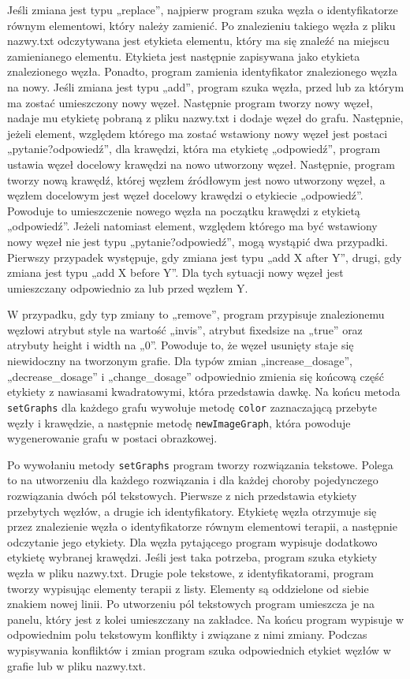 Jeśli zmiana jest typu „replace”, najpierw program szuka węzła o identyfikatorze równym elementowi, który należy zamienić. Po znalezieniu takiego węzła z pliku nazwy.txt odczytywana jest etykieta elementu, który ma się znaleźć na miejscu zamienianego elementu. Etykieta jest następnie zapisywana jako etykieta znalezionego węzła. Ponadto, program zamienia identyfikator znalezionego węzła na nowy. Jeśli zmiana jest typu „add”, program szuka węzła, przed lub za którym ma zostać umieszczony nowy węzeł. Następnie program tworzy nowy węzeł, nadaje mu etykietę pobraną z pliku nazwy.txt i dodaje węzeł do grafu. Następnie, jeżeli element, względem którego ma zostać wstawiony nowy węzeł jest postaci „pytanie?odpowiedź”, dla krawędzi, która ma etykietę „odpowiedź”, program ustawia węzeł docelowy krawędzi na nowo utworzony węzeł. Następnie, program tworzy nową krawędź, której węzłem źródłowym jest nowo utworzony węzeł, a węzłem docelowym jest węzeł docelowy krawędzi o etykiecie „odpowiedź”. Powoduje to umieszczenie nowego węzła na początku krawędzi z etykietą „odpowiedź”. Jeżeli natomiast element, względem którego ma być wstawiony nowy węzeł nie jest typu „pytanie?odpowiedź”, mogą wystąpić dwa przypadki. Pierwszy przypadek występuje, gdy zmiana jest typu „add X after Y”, drugi, gdy zmiana jest typu „add X before Y”. Dla tych sytuacji nowy węzeł jest umieszczany odpowiednio za lub przed węzłem Y. 

W przypadku, gdy typ zmiany to „remove”, program przypisuje znalezionemu węzłowi atrybut style na wartość „invis”, atrybut fixedsize na „true” oraz atrybuty height i width na „0”. Powoduje to, że węzeł usunięty staje się niewidoczny na tworzonym grafie. Dla typów zmian „increase\_dosage”, „decrease\_dosage” i „change\_dosage” odpowiednio zmienia się końcową część etykiety z nawiasami kwadratowymi, która przedstawia dawkę. Na końcu metoda \texttt{setGraphs} dla każdego grafu wywołuje metodę \texttt{color} zaznaczającą przebyte węzły i krawędzie, a następnie metodę \texttt{newImageGraph}, która powoduje wygenerowanie grafu w postaci obrazkowej. 

Po wywołaniu metody \texttt{setGraphs} program tworzy rozwiązania tekstowe. Polega to na utworzeniu dla każdego rozwiązania i dla każdej choroby pojedynczego rozwiązania dwóch pól tekstowych. Pierwsze z nich przedstawia etykiety przebytych węzłów, a drugie ich identyfikatory. Etykietę węzła otrzymuje się przez znalezienie węzła o identyfikatorze równym elementowi terapii, a następnie odczytanie jego etykiety. Dla węzła pytającego program wypisuje dodatkowo etykietę wybranej krawędzi. Jeśli jest taka potrzeba, program szuka etykiety węzła w pliku nazwy.txt. Drugie pole tekstowe, z identyfikatorami, program tworzy wypisując elementy terapii z listy. Elementy są oddzielone od siebie znakiem nowej linii. Po utworzeniu pól tekstowych program umieszcza je na panelu, który jest z kolei umieszczany na zakładce. Na końcu program wypisuje w odpowiednim polu tekstowym konflikty i związane z nimi zmiany. Podczas wypisywania konfliktów i zmian program szuka odpowiednich etykiet węzłów w grafie lub w pliku nazwy.txt. 

